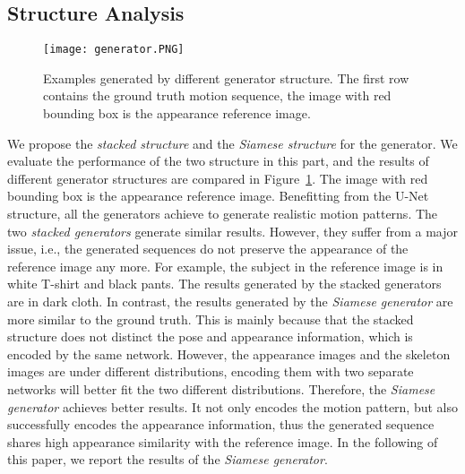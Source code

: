 \documentclass[journal]{IEEEtran}
\begin{document}
\subsection{Structure Analysis}
\begin{figure}
\texttt{[image: generator.PNG]}
\caption{Examples generated by different generator structure. The first row contains the ground truth motion sequence, the image with red bounding box is the appearance reference image.}
\label{fig:generator}
\end{figure}
We propose the \textit{stacked structure} and the \textit{Siamese structure} for the generator. We evaluate the performance of the two structure in this part, and the results of different generator structures are compared in Figure~\ref{fig:generator}. The image with red bounding box is the appearance reference image. Benefitting from the U-Net structure, all the generators achieve to generate realistic motion patterns. The two \textit{stacked generators} generate similar results. However, they suffer from a major issue, i.e., the generated sequences do not preserve the appearance of the reference image any more. For example, the subject in the reference image is in white T-shirt and black pants. The results generated by the stacked generators are in dark cloth.
In contrast, the results generated by the \textit{Siamese generator} are more similar to the ground truth.
This is mainly because that the stacked structure does not distinct the pose and appearance information, which is encoded by the same network. However, the appearance images and the skeleton images are under different distributions, encoding them with two separate networks will better fit the two different distributions. Therefore, the \textit{Siamese generator} achieves better results. It not only encodes the motion pattern, but also successfully encodes the appearance information, thus the generated sequence shares high appearance similarity with the reference image.
In the following of this paper, we report the results of the \textit{Siamese generator}.
\end{document}
